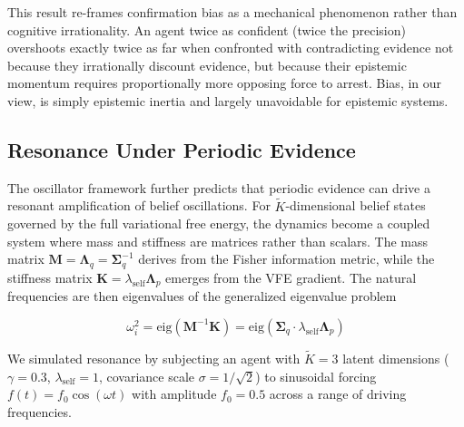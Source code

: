 \documentclass[12pt]{article}
\begin{document}
This result re-frames confirmation bias as a mechanical phenomenon rather than cognitive irrationality. An agent twice as confident (twice the precision) overshoots exactly twice as far when confronted with contradicting evidence not because they irrationally discount evidence, but because their epistemic momentum requires proportionally more opposing force to arrest. Bias, in our view, is simply epistemic inertia and largely unavoidable for epistemic systems.

\subsection{Resonance Under Periodic Evidence}

The oscillator framework further predicts that periodic evidence can drive a resonant amplification of belief oscillations. For $\tilde{K}$-dimensional belief states governed by the full variational free energy, the dynamics become a coupled system where mass and stiffness are matrices rather than scalars. The mass matrix $\mathbf{M} = \boldsymbol{\Lambda}_q = \boldsymbol{\Sigma}_q^{-1}$ derives from the Fisher information metric, while the stiffness matrix $\mathbf{K} = \lambda_{\text{self}} \boldsymbol{\Lambda}_p$ emerges from the VFE gradient. The natural frequencies are then eigenvalues of the generalized eigenvalue problem

\begin{equation}
    \omega_i^2 = \text{eig}(\mathbf{M}^{-1}\mathbf{K}) = \text{eig}(\boldsymbol{\Sigma}_q \cdot \lambda_{\text{self}} \boldsymbol{\Lambda}_p)
\end{equation}

We simulated resonance by subjecting an agent with $\tilde{K}=3$ latent dimensions ($\gamma = 0.3$, $\lambda_{\text{self}} = 1$, covariance scale $\sigma = 1/\sqrt{2}$) to sinusoidal forcing $f(t) = f_0 \cos(\omega t)$ with amplitude $f_0 = 0.5$ across a range of driving frequencies.
\end{document}
